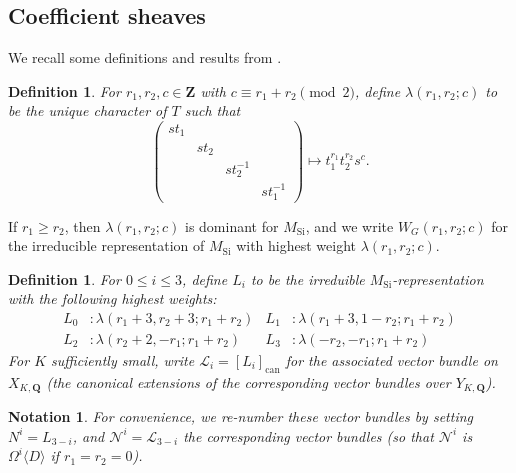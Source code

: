 \documentclass[cjm]{ipart}
\theoremstyle{plain}
\newtheorem{definition}[theorem]{Definition}
\newtheorem{notation}[theorem]{Notation}
\theoremstyle{remark}
\DeclareMathOperator{\Sieg}{Si}
\newcommand{\QQ}{\mathbf{Q}}
\newcommand{\ZZ}{\mathbf{Z}}
\newcommand{\cL}{\mathcal{L}}
\newcommand{\cN}{\mathcal{N}}
\newcommand{\can}{\mathrm{can}}
\numberwithin{equation}{subsection}
\renewcommand{\leq}{\leqslant}
\renewcommand{\geq}{\geqslant}
\begin{document}
 \subsection{Coefficient sheaves}

  We recall some definitions and results from \cite{LPSZ1}.
 
  \begin{definition}
   For $r_1,r_2,c\in\ZZ$ with $c\equiv r_1+r_2\pmod 2$, define $\lambda(r_1,r_2;c)$ to be the unique character of $T$ such that
   \[ \left(\begin{smallmatrix}st_1 &&&\\ & st_2 &&\\ && st_2^{-1} & \\ &&& st_1^{-1}\end{smallmatrix}\right)\mapsto t_1^{r_1}t_2^{r_2}s^c.\]
  \end{definition}

  \begin{remark}
   If $r_1\geq r_2$, then $\lambda(r_1,r_2;c)$ is dominant for $M_{\Sieg}$, and we write $W_G(r_1,r_2;c)$ for the irreducible representation of $M_{\Sieg}$ with highest weight $\lambda(r_1,r_2;c)$.
  \end{remark}

  \begin{definition}
   For $0\leq i\leq 3$, define $L_i$ to be the irreduible $M_{\Sieg}$-representation with the following highest weights:
   \begin{align*}
    L_0 &:  \lambda(r_1+3,r_2+3;r_1+r_2) &  L_1 &: \lambda(r_1+3,1-r_2;r_1+r_2)\\
    L_2 &:  \lambda(r_2+2,-r_1;r_1+r_2)  &  L_3 &: \lambda(-r_2,-r_1;r_1+r_2)
   \end{align*}
   For $K$ sufficiently small, write $\cL_i = [L_i]_{\can}$ for the associated vector bundle on $X_{K, \QQ}$ (the canonical extensions of the corresponding vector bundles over $Y_{K, \QQ}$).
  \end{definition}

  \begin{notation}
   For convenience, we re-number these vector bundles by setting $N^i = L_{3-i}$, and $\cN^i = \cL_{3-i}$ the corresponding vector bundles (so that $\cN^i$ is $\Omega^i\langle D \rangle$ if $r_1 = r_2 = 0$).
  \end{notation}
\end{document}
